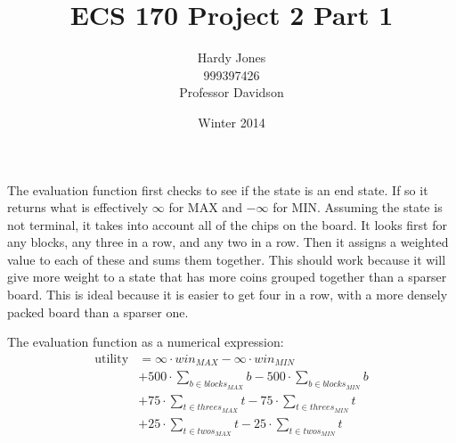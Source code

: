 \documentclass[12pt,letterpaper]{article}
\title{ECS 170 Project 2 Part 1\vspace{-2ex}}
\author{Hardy Jones\\
        999397426\\
        Professor Davidson\vspace{-2ex}}
\date{Winter 2014}
\begin{document}
  \maketitle




  The evaluation function first checks to see if the state is an end state. If so it returns what is effectively $\infty$ for MAX and $-\infty$ for MIN.
  Assuming the state is not terminal, it takes into account all of the chips on the board.
  It looks first for any blocks, any three in a row, and any two in a row.
  Then it assigns a weighted value to each of these and sums them together.
  This should work because it will give more weight to a state that has more coins grouped together than a sparser board.
  This is ideal because it is easier to get four in a row, with a more densely packed board than a sparser one.

  The evaluation function as a numerical expression:
  \begin{align*}
    \text{utility} &= \infty \cdot win_{MAX} - \infty \cdot win_{MIN} \\
    &+ 500 \cdot \sum_{b \in blocks_{MAX}}b - 500 \cdot \sum_{b \in blocks_{MIN}}b \\
    &+ 75 \cdot \sum_{t \in threes_{MAX}}t - 75 \cdot \sum_{t \in threes_{MIN}}t \\
    &+ 25 \cdot \sum_{t \in twos_{MAX}}t - 25 \cdot \sum_{t \in twos_{MIN}}t
  \end{align*}
\end{document}
